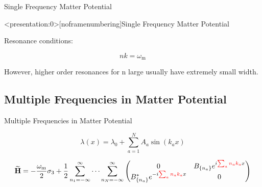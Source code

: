 \documentclass[9pt]{beamer}
\begin{document}
\begin{darkframes}
\begin{frame}{Single Frequency Matter Potential}



\end{frame}



\begin{frame}<presentation:0>[noframenumbering]{Single Frequency Matter Potential}

Resonance conditions:

\begin{equation*}
    nk=\omega_{\mathrm m}
\end{equation*}

However, higher order resonances for n large usually have extremely small width.



\end{frame}



\subsection{Multiple Frequencies in Matter Potential}


\begin{frame}{Multiple Frequencies in Matter Potential}




\begin{equation*}
\lambda(x) = \lambda_0 + \sum_{a=1}^N A_a \sin(k_a x )
\end{equation*}


\begin{tcolorbox}[title=Hamiltonian in Rabi Basis]


\begin{equation*}
\mathbf{\widetilde H}= -\frac{\omega_{\mathrm m}}{2}\sigma_3 + \frac{1}{2} \sum_{n_1=-\infty}^\infty \cdots \sum_{n_N=-\infty}^\infty \begin{pmatrix}
0 &  B_{\{n_a\}} e^{i  {\color{red} \sum_a n_a k_a } x}\\
  B_{\{n_a\}}^* e^{ -i  {\color{red} \sum_a n_a k_a } x} & 0
\end{pmatrix}
\end{equation*}



\end{tcolorbox}
\end{frame}
\end{darkframes}
\end{document}
